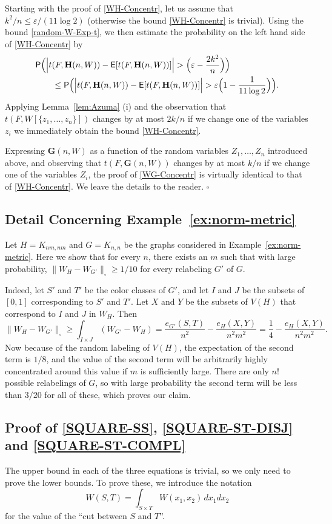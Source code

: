 \documentclass[12pt]{article}
\numberwithin{equation}{section}
\def\eps{\varepsilon}
\def\Prob{{\sf P}}
\def\E{{\sf E}}
\def\bG{{\mathbf G}}
\def\bH{{\mathbf H}}
\begin{document}
Starting with the proof of \eqref{WH-Concentr}, let us assume
that $k^2/n\leq \eps/(11\log 2)$ (otherwise the bound
\eqref{WH-Concentr} is trivial).  Using the bound
\eqref{random-W-Exp-t}, we then estimate the probability on the left
hand side of \eqref{WH-Concentr} by
\[
\begin{aligned}
&\Prob\Bigl(\Bigl|t(F,\bH(n,W))-\E[t(F,\bH(n,W))]\Bigr|
>\Bigl(\eps-\frac{2k^2}n\Bigr)
\Bigr)
\\
&\qquad\leq \Prob\Bigl(\Bigl|t(F,\bH(n,W))-\E[t(F,\bH(n,W))]\Bigr|
>\eps\Bigl(1-\frac
1{11\log 2}\Bigr)\Bigr).
\end{aligned}
\]
Applying Lemma~\ref{lem:Azuma} (i) and the observation that
$t(F,W[\{z_1,\dots,z_n\}])
$ changes by at most $2k/n$ if we change one of the variables
$z_i$
we immediately obtain the bound \eqref{WH-Concentr}.

Expressing $\bG(n,W)$ as a function of the random variables
$Z_1,\dots,Z_n$ introduced above, and observing that $t(F,\bG(n,W))$
changes by at most $k/n$ if we change one of the variables $Z_i$, the
proof of \eqref{WG-Concentr} is virtually identical to that of
\eqref{WH-Concentr}. We leave the details to the reader.
\hfill$\square$

\subsection{Detail Concerning Example~\ref{ex:norm-metric}}

Let $H=K_{nm,nm}$ and $G=K_{n,n}$ be the graphs considered in
Example~\ref{ex:norm-metric}.  Here we show that for  every $n$,
there exists an $m$ such that with large probability,
$\|W_H-W_{G'}\|_\square \ge 1/10$ for every relabeling $G'$ of $G$.

Indeed, let $S'$ and $T'$ be
the color classes of $G'$, and let $I$ and $J$ be the subsets of
$[0,1]$ corresponding to $S'$ and $T'$. Let $X$ and $Y$ be the
subsets of $V(H)$ that correspond to $I$ and $J$ in $W_H$. Then
\[
\|W_H-W_{G'}\|_\square \ge \int_{I\times
J}(W_{G'}-W_{H})=\frac{e_{G'}(S,T)}{n^2}-\frac{e_H(X,Y)}{n^2m^2} =
\frac{1}{4}-\frac{e_H(X,Y)}{n^2m^2}.
\]
Now because of the random labeling of $V(H)$, the expectation of the
second term is $1/8$, and the value of the second term will be
arbitrarily highly concentrated around this value if $m$ is
sufficiently large. There are only $n!$ possible relabelings of $G$,
so with large probability the second term will be less than $3/20$
for all of these, which proves our claim.

\subsection{Proof of \eqref{SQUARE-SS}, \eqref{SQUARE-ST-DISJ} and
\eqref{SQUARE-ST-COMPL}}
The upper bound in each of the three equations is trivial, so we only need
to prove
the lower bounds.  To prove these, we introduce the notation
\[
W(S,T)=\int_{S\times T}
W(x_1,x_2)\,dx_1dx_2
\]
for the value of the ``cut between $S$ and $T$''.
\end{document}
